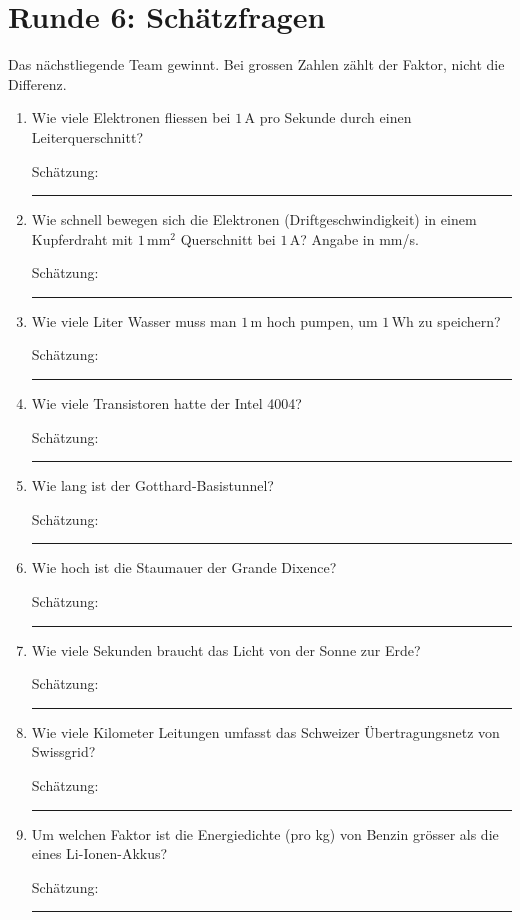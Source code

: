 \documentclass[a4paper,11pt]{article}
\newif\ifloesung
\newcommand{\loesung}[1]{\ifloesung\par\smallskip\noindent\textcolor{zwetschge}{\textbf{Lösung:} #1}\fi}
\newcommand{\schaetz}[2]{%
  \item #1\par\smallskip\noindent Schätzung: \rule{5cm}{0.4pt}%
  \loesung{#2}}
\newcommand{\runde}[2]{\section{Runde #1: #2}}
\begin{document}
\runde{6}{Schätzfragen}
\noindent Das nächstliegende Team gewinnt. Bei grossen Zahlen zählt der Faktor, nicht die Differenz.
\begin{enumerate}
  \schaetz{Wie viele Elektronen fliessen bei $1\,\mathrm{A}$ pro Sekunde durch einen Leiterquerschnitt?}
     {ca.\ $6{,}24 \cdot 10^{18}$ $\left(1/1{,}602 \cdot 10^{-19}\right)$}

  \schaetz{Wie schnell bewegen sich die Elektronen (Driftgeschwindigkeit) in einem Kupferdraht mit $1\,\mathrm{mm^2}$ Querschnitt bei $1\,\mathrm{A}$? Angabe in mm/s.}
     {ca.\ $0{,}07\,\mathrm{mm/s}$, also etwa $26\,\mathrm{cm}$ pro Stunde. $v = I/(nAe)$ mit $n \approx 8{,}5 \cdot 10^{28}\,\mathrm{m^{-3}}$.}

  \schaetz{Wie viele Liter Wasser muss man $1\,\mathrm{m}$ hoch pumpen, um $1\,\mathrm{Wh}$ zu speichern?}
     {ca.\ $367\,\mathrm{l}$ ($3600\,\mathrm{J} / (9{,}81\,\mathrm{m/s^2} \cdot 1\,\mathrm{m})$)}

  \schaetz{Wie viele Transistoren hatte der Intel 4004?}
     {ca.\ 2300}

  \schaetz{Wie lang ist der Gotthard-Basistunnel?}
     {ca.\ $57\,\mathrm{km}$}

  \schaetz{Wie hoch ist die Staumauer der Grande Dixence?}
     {$285\,\mathrm{m}$}

  \schaetz{Wie viele Sekunden braucht das Licht von der Sonne zur Erde?}
     {ca.\ $500\,\mathrm{s}$ (8 Minuten 20 Sekunden)}

  \schaetz{Wie viele Kilometer Leitungen umfasst das Schweizer Übertragungsnetz von Swissgrid?}
     {ca.\ $6700\,\mathrm{km}$ (Stand vor dem Anlass prüfen)}

  \schaetz{Um welchen Faktor ist die Energiedichte (pro kg) von Benzin grösser als die eines Li-Ionen-Akkus?}
     {ca.\ 50 (Benzin $\approx 12\,\mathrm{kWh/kg}$, Akkuzelle $\approx 0{,}25\,\mathrm{kWh/kg}$). Antworten zwischen 40 und 60 gelten als sehr gut.}
\end{enumerate}
\end{document}
